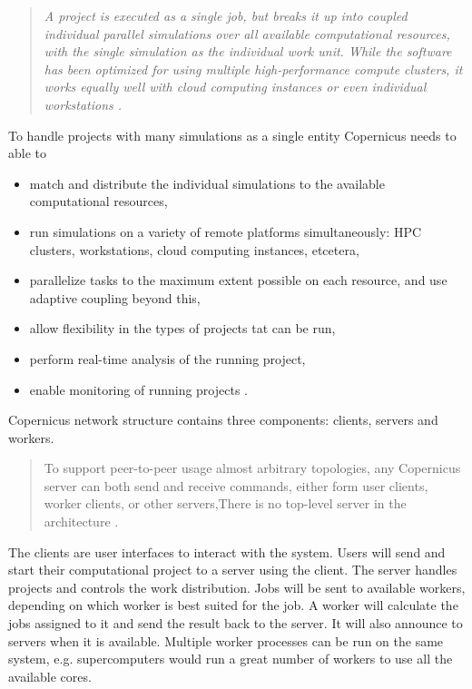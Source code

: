 \begin{quote} \slshape
  A project is executed as a single job, but breaks it up into coupled
  individual parallel simulations over all available computational
  resources, with the single simulation as the individual work
  unit. While the software has been optimized for using multiple
  high-performance compute clusters, it works equally well with cloud
  computing instances or even individual
  workstations \citep{pronk:2011}.
\end{quote}

To handle projects with many simulations as a single entity Copernicus
needs to able to
\renewcommand{\labelitemi}{-}
\begin{itemize} \slshape
\item match and distribute the individual simulations to the available
  computational resources,
\item run simulations on a variety of remote platforms simultaneously:
  HPC clusters, workstations, cloud computing instances, etcetera,
\item parallelize tasks to the maximum extent possible on each
  resource, and use adaptive coupling beyond this,
\item allow flexibility in the types of projects tat can be run,
\item perform real-time analysis of the running project,
\item enable monitoring of running projects \citep{pronk:2011}.
\end{itemize}

Copernicus network structure contains three components: clients,
servers and workers.

\begin{quote}
To support peer-to-peer usage almost arbitrary topologies, any
Copernicus server can both send and receive commands, either form
user clients, worker clients, or other servers,There is no top-level
server in the architecture \citep{pronk:2011}.
\end{quote}


The clients are user interfaces to interact with the system. Users
will send and start their computational project to a server using the
client. The server handles projects and controls the work
distribution. Jobs will be sent to available workers, depending on
which worker is best suited for the job. A worker will calculate the
jobs assigned to it and send the result back to the server. It will
also announce to servers when it is available. Multiple worker
processes can be run on the same system, e.g. supercomputers would run
a great number of workers to use all the available cores.

